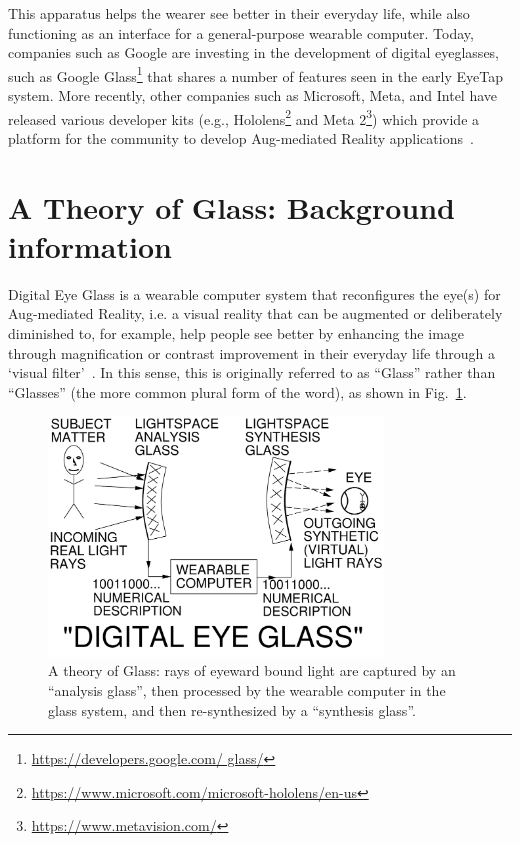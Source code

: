 This apparatus helps the wearer see better in their everyday life, while also functioning as an interface 
for a general-purpose wearable computer. Today, companies such as Google are investing in the 
development of digital eyeglasses, such as Google Glass\footnote{\url{https://developers.google.com/
glass/}} that shares a number of features seen in the early EyeTap system. More recently, other 
companies such as Microsoft, Meta, and Intel have released various developer kits (e.g., 
Hololens\footnote{\url{https://www.microsoft.com/microsoft-hololens/en-us}} and Meta 
2\footnote{\url{https://www.metavision.com/}}) which provide a platform for the community to develop 
Aug-mediated Reality applications~\cite{mann1994mediated}.
%

\section{A Theory of Glass: Background information}

Digital Eye Glass is a wearable computer system that reconfigures the eye(s)
for Aug-mediated Reality, i.e. a visual reality that can be augmented or
deliberately diminished to, for example, help people see better by enhancing the image through 
magnification or contrast improvement in their everyday life through a `visual 
filter'~\cite{mann1994mediated}. 
In this sense, this is originally referred to as ``Glass'' rather than ``Glasses'' (the more common plural 
form of the word), as shown in Fig.~\ref{fig:glass}. 

\begin{figure}
\center
  \includegraphics[width=3.5in]{ch6/figs/Glass.pdf}
  \caption{A theory of Glass: rays of eyeward bound light are captured
           by an ``analysis glass'', then processed by the wearable computer
           in the glass system, and then re-synthesized by a
           ``synthesis glass''.}
  \label{fig:glass}
\end{figure}

